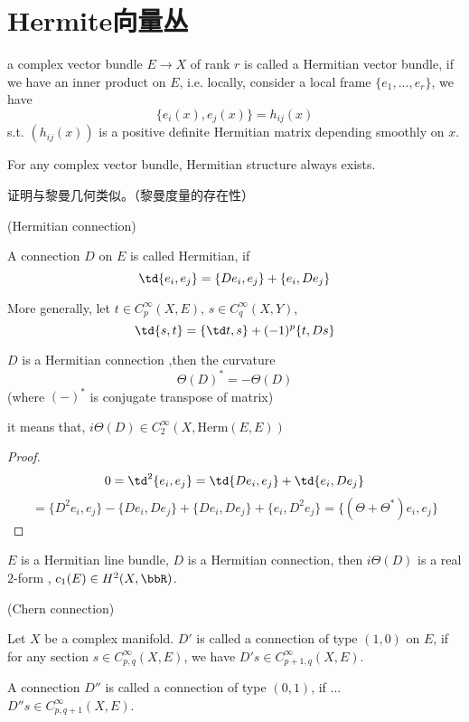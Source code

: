 \section{Hermite向量丛}

\begin{definition}
a complex vector bundle $E\to X$ of rank $r$ is called a Hermitian vector bundle, if
we have an inner product on $E$, i.e. locally, consider a local frame
$\{e_1,...,e_r\}$, we have
$$\{e_i(x),e_j(x)\}=h_{ij}(x)$$
s.t. $(h_{ij}(x))$ is a positive definite Hermitian matrix depending smoothly on $x$.
\end{definition}

\begin{rem}
For any complex vector bundle, Hermitian structure always exists.
\end{rem}

证明与黎曼几何类似。（黎曼度量的存在性）

\begin{definition}(Hermitian connection)%

A connection $D$ on $E$ is called Hermitian, if
$$\td\{e_i,e_j\}=\{De_i,e_j\}+\{e_i,De_j\}$$
\end{definition}

More generally, let $t\in C_p^{\infty}(X,E)$, $s\in C_q^\infty(X,Y)$,
$$\td\{s,t\}=\{\td t,s\}+(-1)^p\{t,Ds\}$$

\begin{prop}
$D$ is a Hermitian connection ,then the curvature
$$\Theta(D)^*=-\Theta(D)$$
(where $(-)^*$ is conjugate transpose of matrix)
\end{prop}

it means that, $i\Theta(D)\in C_2^\infty(X,\text{Herm}(E,E))$

\begin{proof}
$$0=\td^2\{e_i,e_j\}=\td\{De_i,e_j\}+\td\{e_i,De_j\}$$
$$=\{D^2e_i,e_j\}-\{De_i,De_j\}+\{De_i,De_j\}+\{e_i,D^2e_j\}=
\{(\Theta+\Theta^*)e_i,e_j\}$$
\end{proof}

\begin{rem}
$E$ is a Hermitian line bundle, $D$ is a Hermitian connection,
then $i\Theta(D)$ is a real $2$-form ,
$c_1(E)\in H^2(X,\bbR)$.
\end{rem}

(Chern connection)

\begin{definition}Let $X$ be a complex manifold.
$D'$ is called a connection of type $(1,0)$ on $E$,
if for any section $s\in C_{p,q}^\infty(X,E)$, we have
$D's\in C_{p+1,q}^\infty(X,E)$.

A connection $D''$ is called a connection of type $(0,1)$, if ...
$D''s\in C_{p,q+1}^\infty(X,E)$.
\end{definition}

